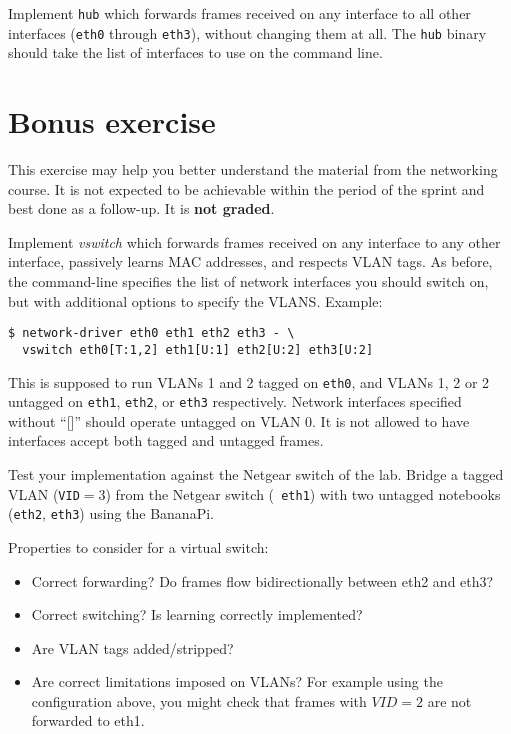 \documentclass{article}
\begin{document}
Implement {\tt hub} which forwards frames received on any interface to
all other interfaces ({\tt eth0} through {\tt eth3}), without changing
them at all.  The {\tt hub} binary should take the list of interfaces
to use on the command line.


\section{Bonus exercise}

This exercise may help you better understand the material from the
networking course. It is not expected to be achievable within the
period of the sprint and best done as a follow-up. It is {\bf not
  graded}.

Implement {\em vswitch} which forwards frames received on any
interface to any other interface, passively learns MAC addresses,
and respects VLAN tags. As before, the command-line specifies the
list of network interfaces you should switch on, but with
additional options to specify the VLANS.  Example:
\begin{verbatim}
$ network-driver eth0 eth1 eth2 eth3 - \
  vswitch eth0[T:1,2] eth1[U:1] eth2[U:2] eth3[U:2]
\end{verbatim}
This is supposed to run VLANs 1 and 2 tagged on {\tt eth0},
and VLANs 1, 2 or 2 untagged on {\tt eth1}, {\tt eth2},
or {\tt eth3} respectively.  Network interfaces specified
without ``[]'' should operate untagged on VLAN 0.  It is
not allowed to have interfaces accept both tagged and
untagged frames.

Test your implementation against the Netgear switch of the lab.
Bridge a tagged VLAN ({\tt VID}$=3$) from the Netgear switch ({\tt
  eth1}) with two untagged notebooks ({\tt eth2}, {\tt eth3}) using
the BananaPi.

Properties to consider for a virtual switch:
\begin{itemize}
\item Correct forwarding? Do frames flow bidirectionally between eth2 and eth3?
\item Correct switching? Is learning correctly implemented?
\item Are VLAN tags added/stripped?
\item Are correct limitations imposed on VLANs?
  For example using the configuration above, you might check that
  frames with $VID=2$ are not forwarded to eth1.
\end{itemize}
\end{document}

